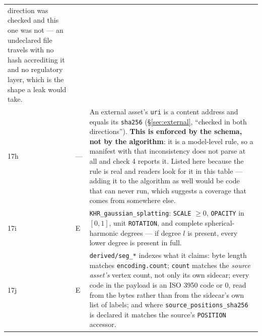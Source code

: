 \documentclass[11pt,a4paper]{article}
\newcommand{\code}[1]{\texttt{\small #1}}
\begin{document}
\begin{longtable}{C{0.8cm} C{0.9cm} L{13.4cm}}
direction was checked and this one was not --- an undeclared file travels with no hash
accrediting it and no regulatory layer, which is the shape a leak would take.\\
17h & --- & An external asset's \code{uri} is a content address and equals its
\code{sha256} (\S\ref{sec:external}, ``checked in both directions''). \textbf{This is
enforced by the schema, not by the algorithm}: it is a model-level rule, so a manifest with
that inconsistency does not parse at all and check 4 reports it. Listed here because the
rule is real and readers look for it in this table --- adding it to the algorithm as well
would be code that can never run, which suggests a coverage that comes from somewhere
else.\\
17i & E & \code{KHR\_gaussian\_splatting}: \code{SCALE} $\geq 0$, \code{OPACITY} in
$[0,1]$, unit \code{ROTATION}, and complete spherical-harmonic degrees --- if degree $l$ is
present, every lower degree is present in full.\\
17j & E & \code{derived/seg\_*} indexes what it claims: byte length matches
\code{encoding.count}; \code{count} matches the \emph{source asset's} vertex count, not
only its own sidecar; every code in the payload is an ISO 3950 code or 0, read from the
bytes rather than from the sidecar's own list of labels; and where
\code{source\_positions\_sha256} is declared it matches the source's \code{POSITION}
accessor.\\


\end{longtable}
\end{document}

